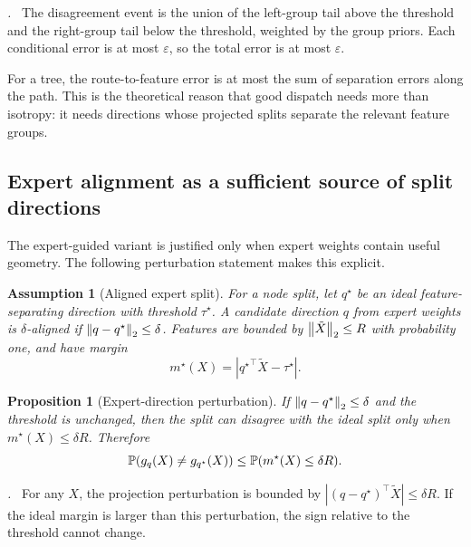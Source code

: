 \documentclass{article}
\newtheorem{assumption}{Assumption}
\newtheorem{proposition}{Proposition}
\renewenvironment{proof}[1][\proofname]{\par\noindent\textit{#1.}\ }{\hfill\qedsymbol\par}
\begin{document}
\begin{proof}
The disagreement event is the union of the left-group tail above the threshold
and the right-group tail below the threshold, weighted by the group priors.  Each
conditional error is at most $\varepsilon$, so the total error is at most
$\varepsilon$.
\end{proof}

For a tree, the route-to-feature error is at most the sum of separation errors
along the path.  This is the theoretical reason that good dispatch needs more
than isotropy: it needs directions whose projected splits separate the relevant
feature groups.

\subsection{Expert alignment as a sufficient source of split directions}

The expert-guided variant is justified only when expert weights contain useful
geometry.  The following perturbation statement makes this explicit.

\begin{assumption}[Aligned expert split]
For a node split, let $q^\star$ be an ideal feature-separating direction with
threshold $\tau^\star$.  A candidate direction $q$ from expert weights is
$\delta$-aligned if $\left\lVert q-q^\star \right\rVert_2\le\delta$.  Features are bounded by
$\left\lVert \tilde X \right\rVert_2\le R$ with probability one, and have margin
\begin{equation}
  m^\star(X)=|{q^\star}^{\top}\tilde X-\tau^\star|.
\end{equation}
\end{assumption}

\begin{proposition}[Expert-direction perturbation]
If $\left\lVert q-q^\star \right\rVert_2\le\delta$ and the threshold is unchanged, then the split
can disagree with the ideal split only when $m^\star(X)\le \delta R$.  Therefore
\begin{equation}
  \mathbb{P}(g_q(X)\ne g_{q^\star}(X))
  \le \mathbb{P}(m^\star(X)\le \delta R).
\end{equation}
\end{proposition}

\begin{proof}
For any $X$, the projection perturbation is bounded by
$|(q-q^\star)^{\top}\tilde X|\le \delta R$.  If the ideal margin is larger than
this perturbation, the sign relative to the threshold cannot change.
\end{proof}
\end{document}
